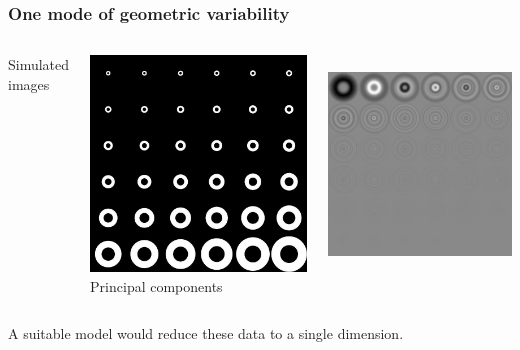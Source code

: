 \begin{frame}
\frametitle{One mode of geometric variability}
\begin{columns}[c]
Simulated images\par
\includegraphics[height=0.9\textwidth]{circles}
Principal components\par
\includegraphics[height=0.9\textwidth]{circles_pca}
\end{columns}
A suitable model would reduce these data to a single dimension.
\end{frame}


